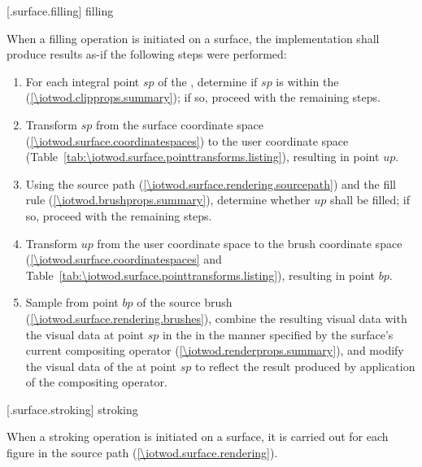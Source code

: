  [\iotwod.surface.filling] { filling}

\pnum
When a filling operation is initiated on a surface, the implementation shall produce results as-if the following steps were performed:

\begin{enumerate}
\item For each integral point $sp$ of the \underlyingsurface, determine if $sp$ is within the  (\ref{\iotwod.clipprops.summary}); if so, proceed with the remaining steps.
\item Transform $sp$ from the surface coordinate space (\ref{\iotwod.surface.coordinatespaces}) to the user coordinate space (Table~\ref{tab:\iotwod.surface.pointtransforms.listing}), resulting in point $up$.
\item Using the source path (\ref{\iotwod.surface.rendering.sourcepath}) and the fill rule (\ref{\iotwod.brushprops.summary}), determine whether $up$ shall be filled; if so, proceed with the remaining steps.
\item Transform $up$ from the user coordinate space to the brush coordinate space (\ref{\iotwod.surface.coordinatespaces} and Table~\ref{tab:\iotwod.surface.pointtransforms.listing}), resulting in point $bp$.
\item Sample from point $bp$ of the source brush (\ref{\iotwod.surface.rendering.brushes}), combine the resulting visual data with the visual data at point $sp$ in the \underlyingsurface in the manner specified by the surface's current compositing operator (\ref{\iotwod.renderprops.summary}), and modify the visual data of the \underlyingsurface at point $sp$ to reflect the result produced by application of the compositing operator.
\end{enumerate}

 [\iotwod.surface.stroking] { stroking}

\pnum
When a stroking operation is initiated on a surface, it is carried out for each figure in the source path (\ref{\iotwod.surface.rendering}).

